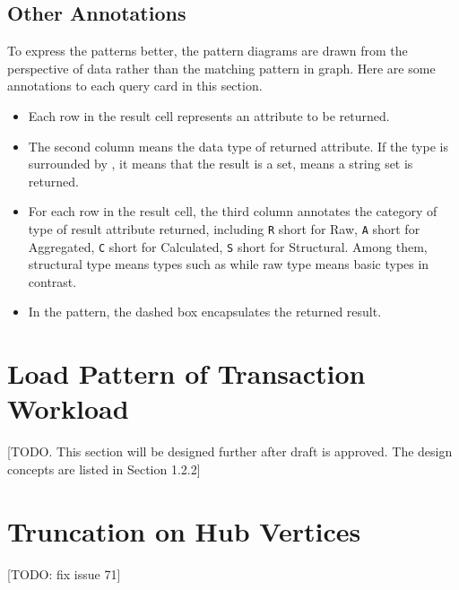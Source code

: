 \subsection{Other Annotations}
\label{subsec:other-annotations}

To express the patterns better, the pattern diagrams are drawn from the perspective
of data rather than the matching pattern in graph. Here are some annotations to each
query card in this section.
\begin{itemize}
    \item Each row in the result cell represents an attribute to be returned.
    \item The second column means the data type of returned attribute.
          If the type is surrounded by \type{\{\}}, it means that the result is a
          set, \eg {} means a string set is returned.
    \item For each row in the result cell, the third column annotates the
          category of type of result attribute returned, including \texttt{R} short
          for Raw, \texttt{A} short for Aggregated, \texttt{C} short for Calculated,
          \texttt{S} short for Structural. Among them, structural type means types
          such as  while raw type means basic types in contrast.
   \item In the pattern, the dashed box encapsulates the returned result. 
\end{itemize}


\section{Load Pattern of Transaction Workload}
 [TODO. This section will be designed further after draft is approved. The design concepts are listed in Section 1.2.2]


\section{Truncation on Hub Vertices}
[TODO: fix issue 71]

